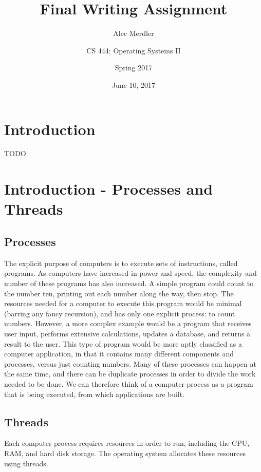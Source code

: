 \documentclass[letterpaper,draftclsnofoot,10pt,onecolumn,titlepage]{IEEEtran}\usepackage[margin=0.75in]{geometry}
\title{Final Writing Assignment}
\author{
	Alec Merdler\\
	\and
	CS 444: Operating Systems II\\
	\and
	Spring 2017\\
}
\date{June 10, 2017}
\begin{document}
\begin{titlepage}
\clearpage\maketitle
\thispagestyle{empty}

\maketitle
\end{titlepage}

\section{Introduction}
TODO


\section{Introduction - Processes and Threads}
    \subsection{Processes}
    The explicit purpose of computers is to execute sets of instructions, called programs. As computers have increased
    in power and speed, the complexity and number of these programs has also increased. A simple program could count
    to the number ten, printing out each number along the way, then stop. The resources needed for a computer to
    execute this program would be minimal (barring any fancy recursion), and has only one explicit process: to
    count numbers. However, a more complex example would be a program that receives user input, performs extensive
    calculations, updates a database, and returns a result to the user. This type of program would be more aptly
    classified as a computer application, in that it contains many different components and processes, versus just
    counting numbers. Many of these processes can happen at the same time, and there can be duplicate processes in
    order to divide the work needed to be done. We can therefore think of a computer process as a program that is
    being executed, from which applications are built.

    \subsection{Threads}
    Each computer process requires resources in order to run, including the CPU, RAM, and hard disk storage. The
    operating system allocates these resources using threads.
\end{document}
